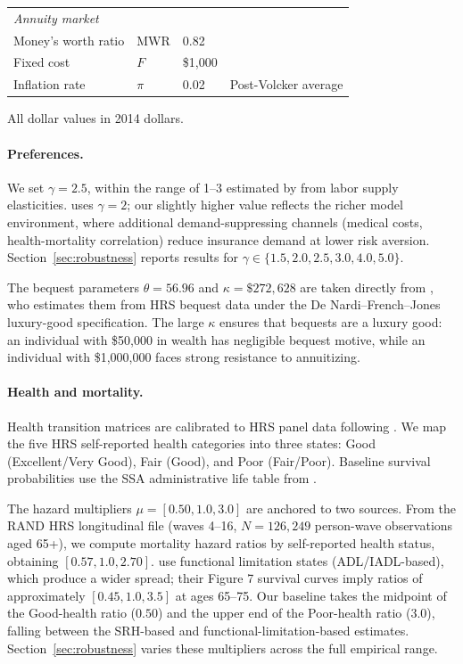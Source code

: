 \documentclass[12pt]{article}
\begin{document}
\begin{table}[htbp]
\begin{threeparttable}
\begin{tabular}{llll}
\multicolumn{4}{l}{\textit{Annuity market}} \\
Money's worth ratio & MWR & 0.82 & \citet{mitchell1999} \\
Fixed cost & $F$ & \$1,000 & \citet{lockwood2012} \\
Inflation rate & $\pi$ & 0.02 & Post-Volcker average \\
\bottomrule
\end{tabular}
\begin{tablenotes}
\small
\item All dollar values in 2014 dollars.
\end{tablenotes}
\end{threeparttable}
\end{table}

\paragraph{Preferences.} We set $\gamma = 2.5$, within the range of 1--3 estimated by \citet{chetty2006} from labor supply elasticities. \citet{lockwood2012} uses $\gamma = 2$; our slightly higher value reflects the richer model environment, where additional demand-suppressing channels (medical costs, health-mortality correlation) reduce insurance demand at lower risk aversion. Section~\ref{sec:robustness} reports results for $\gamma \in \{1.5, 2.0, 2.5, 3.0, 4.0, 5.0\}$.

The bequest parameters $\theta = 56.96$ and $\kappa = \$272{,}628$ are taken directly from \citet{lockwood2012}, who estimates them from HRS bequest data under the De Nardi--French--Jones luxury-good specification. The large $\kappa$ ensures that bequests are a luxury good: an individual with \$50,000 in wealth has negligible bequest motive, while an individual with \$1,000,000 faces strong resistance to annuitizing.

\paragraph{Health and mortality.} Health transition matrices are calibrated to HRS panel data following \citet{denardi2010}. We map the five HRS self-reported health categories into three states: Good (Excellent/Very Good), Fair (Good), and Poor (Fair/Poor). Baseline survival probabilities use the SSA administrative life table from \citet{lockwood2012}.

The hazard multipliers $\mu = [0.50, 1.0, 3.0]$ are anchored to two sources. From the RAND HRS longitudinal file (waves 4--16, $N = 126{,}249$ person-wave observations aged 65+), we compute mortality hazard ratios by self-reported health status, obtaining $[0.57, 1.0, 2.70]$. \citet{reichlingsmetters2015} use functional limitation states (ADL/IADL-based), which produce a wider spread; their Figure 7 survival curves imply ratios of approximately $[0.45, 1.0, 3.5]$ at ages 65--75. Our baseline takes the midpoint of the Good-health ratio ($0.50$) and the upper end of the Poor-health ratio ($3.0$), falling between the SRH-based and functional-limitation-based estimates. Section~\ref{sec:robustness} varies these multipliers across the full empirical range.
\end{document}
